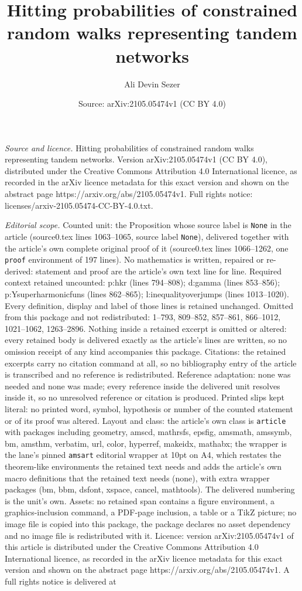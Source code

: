 \documentclass[10pt,a4paper]{amsart}
\title[Hitting probabilities of constrained random walks representi]{Hitting probabilities of constrained random walks representing tandem networks}
\author{Ali Devin Sezer}
\date{Source: arXiv:2105.05474v1 (CC BY 4.0)}
\begin{document}
\maketitle

\noindent\emph{Source and licence.} Hitting probabilities of constrained random walks representing tandem networks. Version arXiv:2105.05474v1 (CC BY 4.0), distributed under the Creative Commons Attribution 4.0 International licence, as recorded in the arXiv licence metadata for this exact version and shown on the abstract page https://arxiv.org/abs/2105.05474v1. Full rights notice: licenses/arxiv-2105.05474-CC-BY-4.0.txt.\par\smallskip

\noindent\textit{Editorial scope.} Counted unit: the Proposition whose source label is \texttt{None} in the article (source0.tex lines 1063--1065, source label \texttt{None}), delivered together with the article's own complete original proof of it (source0.tex lines 1066--1262, one \texttt{proof} environment of 197 lines). No mathematics is written, repaired or re-derived: statement and proof are the article's own text line for line. Required context retained uncounted: p:hkr (lines 794--808); d:gamma (lines 853--856); p:Ysuperharmonicfuns (lines 862--865); l:inequalityoverjumps (lines 1013--1020). Every definition, display and label of those lines is retained unchanged. Omitted from this package and not redistributed: 1--793, 809--852, 857--861, 866--1012, 1021--1062, 1263--2896. Nothing inside a retained excerpt is omitted or altered: every retained body is delivered exactly as the article's lines are written, so no omission receipt of any kind accompanies this package. Citations: the retained excerpts carry no citation command at all, so no bibliography entry of the article is transcribed and no reference is redistributed. Reference adaptation: none was needed and none was made; every reference inside the delivered unit resolves inside it, so no unresolved reference or citation is produced. Printed slips kept literal: no printed word, symbol, hypothesis or number of the counted statement or of its proof was altered. Layout and class: the article's own class is \texttt{article} with packages including geometry, amscd, mathrsfs, epsfig, amsmath, amssymb, bm, amsthm, verbatim, url, color, hyperref, makeidx, mathabx; the wrapper is the lane's pinned \texttt{amsart} editorial wrapper at 10pt on A4, which restates the theorem-like environments the retained text needs and adds the article's own macro definitions that the retained text needs (none), with extra wrapper packages (bm, bbm, dsfont, xspace, cancel, mathtools). The delivered numbering is the unit's own. Assets: no retained span contains a figure environment, a graphics-inclusion command, a PDF-page inclusion, a table or a TikZ picture; no image file is copied into this package, the package declares no asset dependency and no image file is redistributed with it. Licence: version arXiv:2105.05474v1 of this article is distributed under the Creative Commons Attribution 4.0 International licence, as recorded in the arXiv licence metadata for this exact version and shown on the abstract page https://arxiv.org/abs/2105.05474v1. A full rights notice is delivered at 
\end{document}
